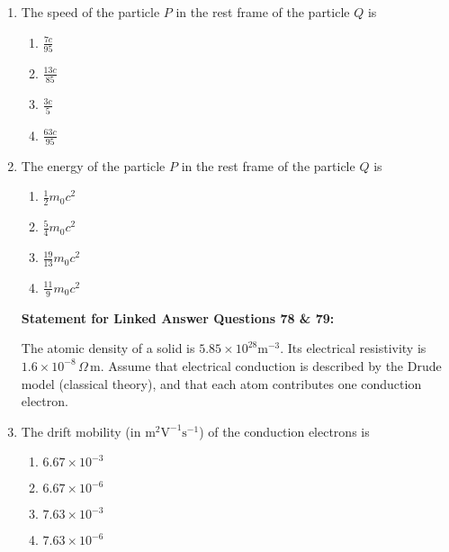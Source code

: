 \documentclass[journal,12pt,onecolumn]{IEEEtran}
\theoremstyle{remark}
\begin{document}
\begin{enumerate}
    \item  The speed of the particle $P$ in the rest frame of the particle $Q$ is
    \begin{multicols}{4}
    \begin{enumerate}
        \item $\frac{7c}{95}$
        \item $\frac{13c}{85}$
        \item $\frac{3c}{5}$
        \item $\frac{63c}{95}$
    \end{enumerate}
    \end{multicols}

    \item  The energy of the particle $P$ in the rest frame of the particle $Q$ is
    \begin{multicols}{4}
    \begin{enumerate}
        \item $\frac{1}{2} m_0 c^2$
        \item $\frac{5}{4} m_0 c^2$
        \item $\frac{19}{13} m_0 c^2$
        \item $\frac{11}{9} m_0 c^2$
    \end{enumerate}
    \end{multicols}


\bigskip

\textbf{Statement for Linked Answer Questions 78 \& 79:}

The atomic density of a solid is $5.85 \times 10^{28} \text{m}^{-3}$. Its electrical resistivity is $1.6 \times 10^{-8} \, \Omega \, \text{m}$. Assume that electrical conduction is described by the Drude model (classical theory), and that each atom contributes one conduction electron.


    \item The drift mobility (in $\text{m}^2 \text{V}^{-1} \text{s}^{-1}$) of the conduction electrons is
    \begin{multicols}{4}
    \begin{enumerate}
        \item $6.67 \times 10^{-3}$
        \item $6.67 \times 10^{-6}$
        \item $7.63 \times 10^{-3}$
        \item $7.63 \times 10^{-6}$
    \end{enumerate}
    \end{multicols}


\end{enumerate}
\end{document}
